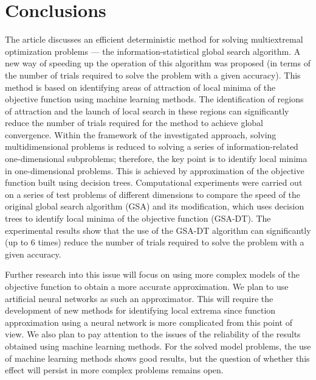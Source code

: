 \documentclass[entropy,article,submit,moreauthors,pdftex]{Definitions/mdpi}
\begin{document}
\section{Conclusions}

The article discusses an efficient deterministic method for solving multiextremal optimization problems --- the information-statistical global search algorithm.
A new way of speeding up the operation of this algorithm was proposed (in terms of the number of trials required to solve the problem with a given accuracy). This method is based on identifying areas of attraction of local minima of the objective function using machine learning methods. The identification of regions of attraction and the launch of local search in these regions can significantly reduce the number of trials required for the method to achieve global convergence. 
Within the framework of the investigated approach, solving multidimensional problems is reduced to solving a series of information-related one-dimensional subproblems; therefore, the key point is to identify local minima in one-dimensional problems. This is achieved by approximation of the objective function built using decision trees. 
Computational experiments were carried out on a series of test problems of different dimensions to compare the speed of the original global search algorithm (GSA) and its modification, which uses decision trees to identify local minima of the objective function (GSA-DT). 
The experimental results show that the use of the GSA-DT algorithm can significantly (up to 6 times) reduce the number of trials required to solve the problem with a given accuracy.

Further research into this issue will focus on using more complex models of the objective function to obtain a more accurate approximation. We plan to use artificial neural networks as such an approximator. This will require the development of new methods for identifying local extrema since function approximation using a neural network is more complicated from this point of view. We also plan to pay attention to the issues of the reliability of the results obtained using machine learning methods. For the solved model problems, the use of machine learning methods shows good results, but the question of whether this effect will persist in more complex problems remains open.



\end{document}
